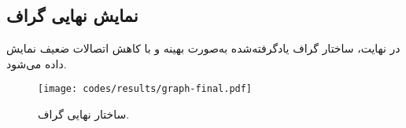 \documentclass[10pt,twocolumn,a4paper]{article}
\begin{document}
	\subsection{نمایش نهایی گراف}
	در نهایت، ساختار گراف یادگرفته‌شده به‌صورت بهینه و با کاهش اتصالات ضعیف نمایش داده می‌شود.
	
	\begin{latin}
		
	\end{latin}
	
	
	\begin{figure}[H]
		\centering
		\texttt{[image: codes/results/graph-final.pdf]}
		\caption{ساختار نهایی گراف.}
		\label{fig:graph-final}
	\end{figure}
	
    	

    
  
\end{document}

